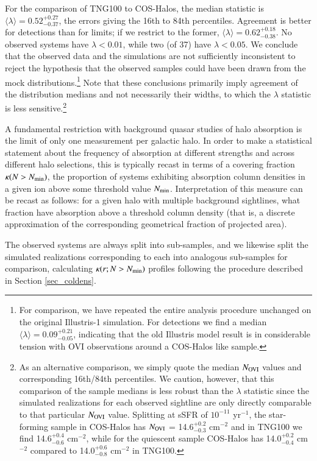 \documentclass[useAMS,usenatbib]{mnras}
\newcommand{\ovi}{OVI\xspace}
\begin{document}
For the comparison of TNG100 to COS-Halos, the median statistic is $\langle\lambda\rangle = 0.52^{+0.27}_{-0.37}$, the errors giving the 16th to 84th percentiles. Agreement is better for detections than for limits; if we restrict to the former, $\langle\lambda\rangle = 0.62^{+0.18}_{-0.38}$. No observed systems have $\lambda < 0.01$, while two (of 37) have $\lambda < 0.05$. We conclude that the observed data and the simulations are not sufficiently inconsistent to reject the hypothesis that the observed samples could have been drawn from the mock distributions.\footnote{For comparison, we have repeated the entire analysis procedure unchanged on the original Illustris-1 simulation. For detections we find a median $\langle\lambda\rangle = 0.09^{+0.21}_{-0.05}$, indicating that the old Illustris model result is in considerable tension with \ovi observations around a COS-Halos like sample.} Note that these conclusions primarily imply agreement of the distribution medians and not necessarily their widths, to which the $\lambda$ statistic is less sensitive.\footnote{As an alternative comparison, we simply quote the median $N_{\rm OVI}$ values and corresponding 16th/84th percentiles. We caution, however, that this comparison of the sample medians is less robust than the $\lambda$ statistic since the simulated realizations for each observed sightline are only directly comparable to that particular $N_{\rm OVI}$ value. Splitting at sSFR of $10^{-11}$ yr$^{-1}$, the star-forming sample in COS-Halos has $N_{\rm OVI}$ = 14.6$^{+0.2}_{-0.3}$ cm$^{-2}$ and in TNG100 we find 14.6$^{+0.4}_{-0.6}$ cm$^{-2}$, while for the quiescent sample COS-Halos has 14.0$^{+0.2}_{-0.4}$ cm$^{-2}$ compared to 14.0$^{+0.6}_{-0.8}$ cm$^{-2}$ in TNG100.}

A fundamental restriction with background quasar studies of halo absorption is the limit of only one measurement per galactic halo. In order to make a statistical statement about the frequency of absorption at different strengths and across different halo selections, this is typically recast in terms of a covering fraction $\kappa(N > N_{\rm min})$, the proportion of systems exhibiting absorption column densities in a given ion above some threshold value $N_{\rm min}$. Interpretation of this measure can be recast as follows: for a given halo with multiple background sightlines, what fraction have absorption above a threshold column density (that is, a discrete approximation of the corresponding geometrical fraction of projected area). 

The observed systems are always split into sub-samples, and we likewise split the simulated realizations corresponding to each into analogous sub-samples for comparison, calculating $\kappa(r; N > N_{\rm min})$ profiles following the procedure described in Section \ref{sec_coldens}.
\end{document}
